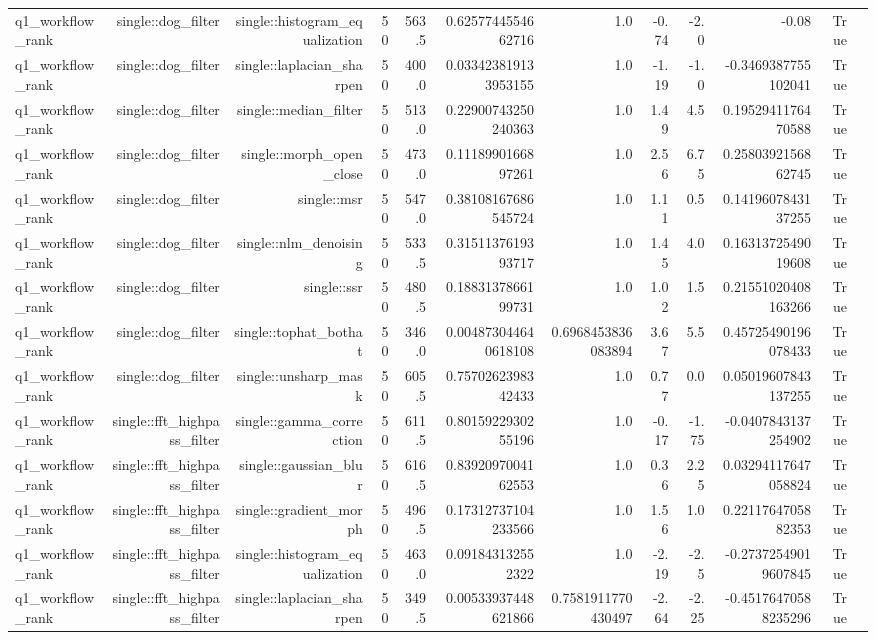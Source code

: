 \begin{tabular}{lrrrrrrrrrrr}
q1\_workflow\_rank & single::dog\_filter & single::histogram\_equalization & 50 & 563.5 & 0.6257744554662716 & 1.0 & -0.74 & -2.0 & -0.08 & True &  \\
q1\_workflow\_rank & single::dog\_filter & single::laplacian\_sharpen & 50 & 400.0 & 0.033423819133953155 & 1.0 & -1.19 & -1.0 & -0.3469387755102041 & True &  \\
q1\_workflow\_rank & single::dog\_filter & single::median\_filter & 50 & 513.0 & 0.22900743250240363 & 1.0 & 1.49 & 4.5 & 0.1952941176470588 & True &  \\
q1\_workflow\_rank & single::dog\_filter & single::morph\_open\_close & 50 & 473.0 & 0.1118990166897261 & 1.0 & 2.56 & 6.75 & 0.2580392156862745 & True &  \\
q1\_workflow\_rank & single::dog\_filter & single::msr & 50 & 547.0 & 0.38108167686545724 & 1.0 & 1.11 & 0.5 & 0.1419607843137255 & True &  \\
q1\_workflow\_rank & single::dog\_filter & single::nlm\_denoising & 50 & 533.5 & 0.3151137619393717 & 1.0 & 1.45 & 4.0 & 0.1631372549019608 & True &  \\
q1\_workflow\_rank & single::dog\_filter & single::ssr & 50 & 480.5 & 0.1883137866199731 & 1.0 & 1.02 & 1.5 & 0.21551020408163266 & True &  \\
q1\_workflow\_rank & single::dog\_filter & single::tophat\_bothat & 50 & 346.0 & 0.004873044640618108 & 0.6968453836083894 & 3.67 & 5.5 & 0.45725490196078433 & True &  \\
q1\_workflow\_rank & single::dog\_filter & single::unsharp\_mask & 50 & 605.5 & 0.7570262398342433 & 1.0 & 0.77 & 0.0 & 0.05019607843137255 & True &  \\
q1\_workflow\_rank & single::fft\_highpass\_filter & single::gamma\_correction & 50 & 611.5 & 0.8015922930255196 & 1.0 & -0.17 & -1.75 & -0.0407843137254902 & True &  \\
q1\_workflow\_rank & single::fft\_highpass\_filter & single::gaussian\_blur & 50 & 616.5 & 0.8392097004162553 & 1.0 & 0.36 & 2.25 & 0.03294117647058824 & True &  \\
q1\_workflow\_rank & single::fft\_highpass\_filter & single::gradient\_morph & 50 & 496.5 & 0.17312737104233566 & 1.0 & 1.56 & 1.0 & 0.2211764705882353 & True &  \\
q1\_workflow\_rank & single::fft\_highpass\_filter & single::histogram\_equalization & 50 & 463.0 & 0.091843132552322 & 1.0 & -2.19 & -2.5 & -0.27372549019607845 & True &  \\
q1\_workflow\_rank & single::fft\_highpass\_filter & single::laplacian\_sharpen & 50 & 349.5 & 0.00533937448621866 & 0.7581911770430497 & -2.64 & -2.25 & -0.45176470588235296 & True &  \\

\end{tabular}
